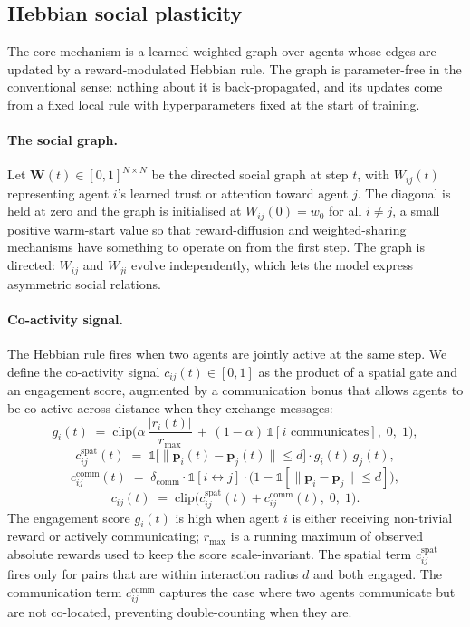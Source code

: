 \documentclass{article}
\theoremstyle{plain}
\theoremstyle{definition}
\theoremstyle{remark}
\begin{document}
\subsection{Hebbian social plasticity}
\label{sec:hebbian_method}

The core mechanism is a learned weighted graph over agents whose edges are updated by a reward-modulated Hebbian rule. The graph is parameter-free in the conventional sense: nothing about it is back-propagated, and its updates come from a fixed local rule with hyperparameters fixed at the start of training.

\paragraph{The social graph.}
Let $\mathbf{W}(t) \in [0, 1]^{N \times N}$ be the directed social graph at step $t$, with $W_{ij}(t)$ representing agent $i$'s learned trust or attention toward agent $j$. The diagonal is held at zero and the graph is initialised at $W_{ij}(0) = w_0$ for all $i \neq j$, a small positive warm-start value so that reward-diffusion and weighted-sharing mechanisms have something to operate on from the first step. The graph is directed: $W_{ij}$ and $W_{ji}$ evolve independently, which lets the model express asymmetric social relations.

\paragraph{Co-activity signal.}
The Hebbian rule fires when two agents are jointly active at the same step. We define the co-activity signal $c_{ij}(t) \in [0, 1]$ as the product of a spatial gate and an engagement score, augmented by a communication bonus that allows agents to be co-active across distance when they exchange messages:
\[
g_i(t) \;=\; \mathrm{clip}\!\Big(\alpha \, \frac{|r_i(t)|}{r_{\max}} \,+\, (1 - \alpha) \, \mathds{1}[i \text{ communicates}],\; 0,\; 1\Big),
\]
\[
c^{\text{spat}}_{ij}(t) \;=\; \mathds{1}\!\big[\|\mathbf{p}_i(t) - \mathbf{p}_j(t)\| \le d\big] \cdot g_i(t) \, g_j(t),
\]
\[
c^{\text{comm}}_{ij}(t) \;=\; \delta_{\text{comm}} \cdot \mathds{1}[i \leftrightarrow j] \cdot \big(1 - \mathds{1}[\|\mathbf{p}_i - \mathbf{p}_j\| \le d]\big),
\]
\[
c_{ij}(t) \;=\; \mathrm{clip}\!\big(c^{\text{spat}}_{ij}(t) + c^{\text{comm}}_{ij}(t),\; 0,\; 1\big).
\]
The engagement score $g_i(t)$ is high when agent $i$ is either receiving non-trivial reward or actively communicating; $r_{\max}$ is a running maximum of observed absolute rewards used to keep the score scale-invariant. The spatial term $c^{\text{spat}}_{ij}$ fires only for pairs that are within interaction radius $d$ and both engaged. The communication term $c^{\text{comm}}_{ij}$ captures the case where two agents communicate but are not co-located, preventing double-counting when they are.
\end{document}
